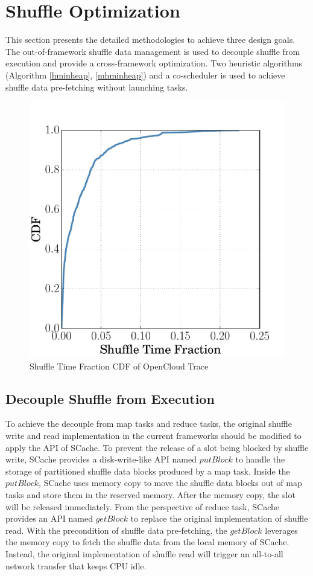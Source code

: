\section{Shuffle Optimization}
\label{opt}
This section presents the detailed methodologies to achieve three design goals. 
The out-of-framework shuffle data management is used to decouple shuffle from execution and provide a cross-framework optimization. 
Two heuristic algorithms (Algorithm \ref{hminheap}, \ref{mhminheap}) and a co-scheduler is used to achieve shuffle data pre-fetching without launching tasks.
\begin{figure}
	\centering
	\includegraphics[width=0.5\linewidth]{fig/reduce_cdf}
	\caption{Shuffle Time Fraction CDF of OpenCloud Trace}
	\label{fig:cdf}
	\vspace{-1em}
\end{figure}
\subsection{Decouple Shuffle from Execution}
\ifrevision
\reversemarginpar
{}
\fi
To achieve the decouple from map tasks and reduce tasks, the original shuffle write and read implementation in the current frameworks should be modified to apply the API of SCache.
To prevent the release of a slot being blocked by shuffle write,  
SCache provides a disk-write-like API named $putBlock$ to handle the storage of partitioned shuffle data blocks produced by a map task.
Inside the $putBlock$, SCache uses memory copy to move the shuffle data blocks out of map tasks and store them in the reserved memory.
After the memory copy, the slot will be released immediately.
From the perspective of reduce task, SCache provides an API named $getBlock$ to replace the original implementation of shuffle read. 
With the precondition of shuffle data pre-fetching, 
the $getBlock$ leverages the memory copy to fetch the shuffle data from the local memory of SCache.
Instead, the original implementation of shuffle read will trigger an all-to-all network transfer that keeps CPU idle.

